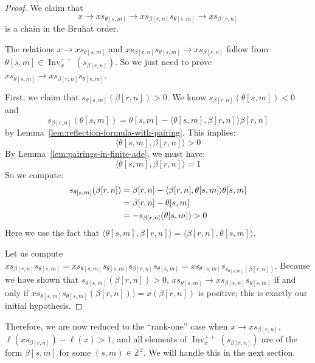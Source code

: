 \documentclass[ALCO,ThmDefs,Unicode]{cedram}
\DeclareMathOperator{\Inv}{Inv}
\newcommand{\ZZ}{\mathbb{Z}}
\newcommand{\Invplusplusx}{\Inv^{++}_x}
\begin{document}
\begin{proof}
We claim that
\begin{equation}\label{eq:12}
x \rightarrow x s_{\theta[s,m]} \rightarrow x s_{\beta[r,n]} s_{\theta[s,m]} \rightarrow x s_{\beta[r,n]}
\end{equation}
is a chain in the Bruhat order.

The relations $x \rightarrow x s_{\theta[s,m]}$ and $x s_{\beta[r,n]} s_{\theta[s,m]} \rightarrow x s_{\beta[r,n]}$ follow from $\theta[s,m] \in \Invplusplusx(s_{\beta[r,n]})$. So we just need to prove $x s_{\theta[s,m]} \rightarrow x s_{\beta[r,n]} s_{\theta[s,m]} $.

First, we claim that $s_{\theta[s,m]}(\beta[r,n]) > 0$. We know $s_{\beta[r,n]}(\theta[s,m]) < 0$ and
\begin{equation}\label{eq:13}
s_{\beta[r,n]}(\theta[s,m]) = \theta[s,m] - \langle \theta[s,m], \beta[r,n] \rangle \beta[r,n]
\end{equation}
by Lemma~\ref{lem:reflection-formula-with-pairing}. This implies:
\begin{equation}\label{eq:14}
\langle \theta[s,m], \beta[r,n] \rangle > 0
\end{equation}
By Lemma~\ref{lem:pairings-in-finite-ade}, we must have:
\begin{equation}\label{eq:10}
\langle \theta[s,m], \beta[r,n] \rangle = 1
\end{equation}
So we compute:
\begin{align}\label{eq:20}
s_{\theta[s,m]}(\beta[r,n]) &= \beta[r,n] - \langle \beta[r,n], \theta[s,m] \rangle \theta[s,m]\\
&= \beta[r,n] - \theta[s,m]\notag\\
&= - s_{\beta[r,n]}(\theta[s,m]) > 0\notag
\end{align}
Here we use the fact that $ \langle \theta[s,m], \beta[r,n] \rangle = \langle \beta[r,n], \theta[s,m] \rangle$.

Let us compute $x s_{\beta[r,n]} s_{\theta[s,m]} = x s_{\theta[s,m]} s_{\theta[s,m]} s_{\beta[r,n]} s_{\theta[s,m]} = x s_{\theta[s,m]} s_{s_{\theta[s,m]}(\beta[r,n])}$. Because we have shown that $s_{\theta[s,m]}(\beta[r,n]) > 0$, $x s_{\theta[s,m]} \rightarrow x s_{\beta[r,n]} s_{\theta[s,m]} $ if and only if $x s_{\theta[s,m]} s_{\theta[s,m]}(\beta[r,n])) = x(\beta[r,n])$ is positive; this is exactly our initial hypothesis.
\end{proof}

Therefore, we are now reduced to the ``rank-one'' case when $x \rightarrow x s_{\beta[r,n]}$, $\ell(x s_{\beta[r,n]}) - \ell(x) > 1$, and all elements of $\Invplusplusx(s_{\beta[r,n]})$ are of the form $\beta[s,m]$ for some $(s,m) \in \ZZ^2$. We will handle this in the next section.
\end{document}
